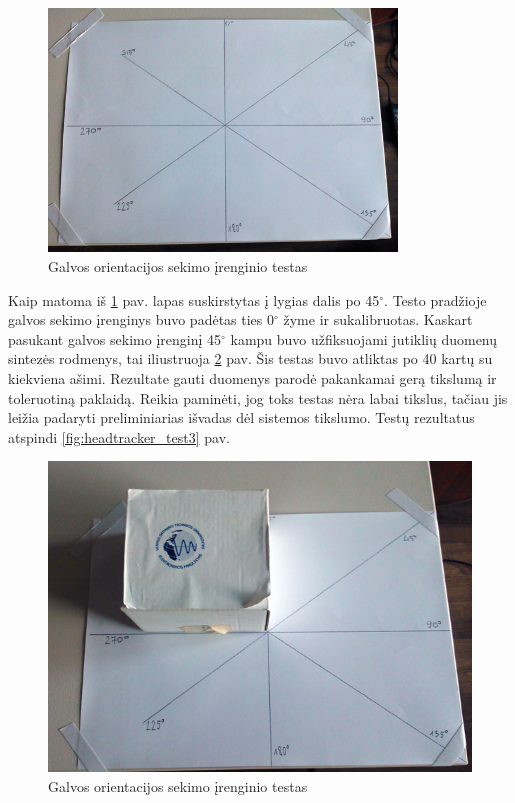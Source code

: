 \documentclass[]{vgtuef}
\begin{document}
{\begin{figure}[htbp]
  \centering
  \includegraphics[width=350px]{img/head_tracker_testu_stalas.png}
  \caption{Galvos orientacijos sekimo įrenginio testas}
  \label{fig:headtracker_test1}
\end{figure}

Kaip matoma iš \ref{fig:headtracker_test1} pav. lapas suskirstytas į lygias dalis po 45$^\circ$. Testo pradžioje galvos sekimo įrenginys buvo padėtas ties 0$^\circ$ žyme ir sukalibruotas. Kaskart pasukant galvos sekimo įrenginį 45$^\circ$ kampu buvo užfiksuojami jutiklių duomenų sintezės rodmenys, tai iliustruoja \ref{fig:headtracker_test2} pav. Šis testas buvo atliktas po 40 kartų su kiekviena ašimi. Rezultate gauti duomenys parodė pakankamai gerą tikslumą ir toleruotiną paklaidą. Reikia paminėti, jog toks testas nėra labai tikslus, tačiau jis leižia padaryti preliminiarias išvadas dėl sistemos tikslumo. Testų rezultatus atspindi \ref{fig:headtracker_test3} pav. 

\begin{figure}[htbp]
  \centering
  \includegraphics[width=450px]{img/head_tracker_testas.png}
  \caption{Galvos orientacijos sekimo įrenginio testas}
  \label{fig:headtracker_test2}
\end{figure}

}
\end{document}
